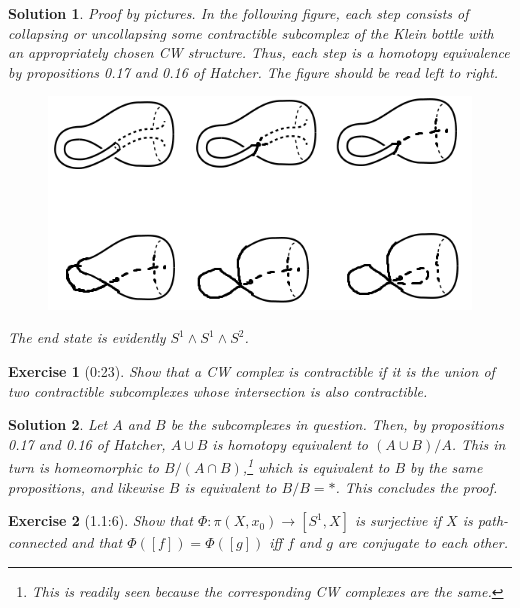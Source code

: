 \documentclass{article}
\theoremstyle{plain}
\newtheorem*{ex}{Exercise}
\theoremstyle{nonumberplain}
\newtheorem{sol}{Solution}
\begin{document}
\begin{sol}
Proof by pictures. In the following figure, each step consists of collapsing or uncollapsing some contractible subcomplex of the Klein bottle with an appropriately chosen CW structure. Thus, each step is a homotopy equivalence by propositions 0.17 and 0.16 of Hatcher. The figure should be read left to right.

\begin{figure}[H]
\centering
\includegraphics{klein}
\end{figure}

The end state is evidently $S^1 \wedge S^1 \wedge S^2$.
\end{sol}

\begin{ex}[0:23]
Show that a CW complex is contractible if it is the union of two contractible subcomplexes whose intersection is also contractible.
\end{ex}

\begin{sol}
Let $A$ and $B$ be the subcomplexes in question. Then, by propositions 0.17 and 0.16 of Hatcher, $A \cup B$ is homotopy equivalent to $(A \cup B)/A$. This in turn is homeomorphic to $B/(A \cap B)$,\footnote{This is readily seen because the corresponding CW complexes are the same.} which is equivalent to $B$ by the same propositions, and likewise $B$ is equivalent to $B/B = *$. This concludes the proof.
\end{sol}

\begin{ex}[1.1:6]
Show that $\Phi \colon \pi(X,x_0) \to [S^1, X]$ is surjective if $X$ is path-connected and that $\Phi([f]) = \Phi([g])$ iff $f$ and $g$ are conjugate to each other.
\end{ex}
\end{document}
